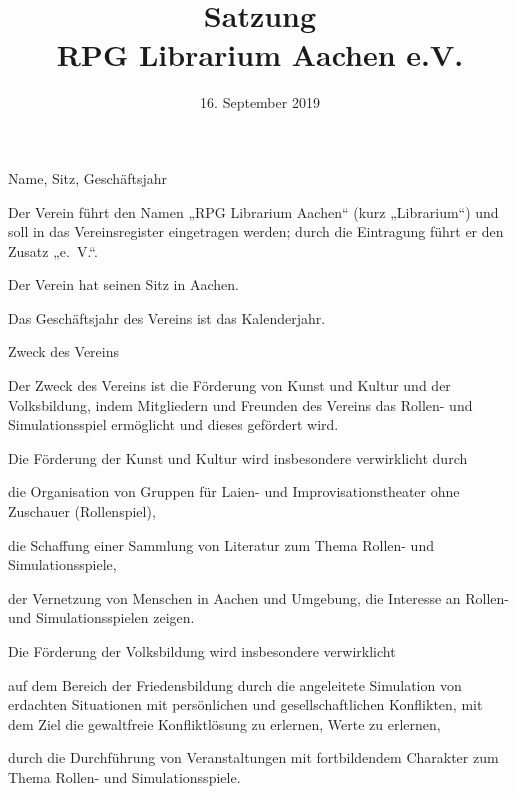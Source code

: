 \documentclass[11pt,a4paper,twoside,openany,article]{memoir}
\title{ Satzung \\ RPG Librarium Aachen e.V.}
\date{16. September 2019}
\begin{document}
  \maketitle
  \sloppy
\begin{para}{Name, Sitz, Geschäftsjahr}
  \label{p:name}
  \item Der Verein führt den Namen „RPG Librarium Aachen“ (kurz „Librarium“) und soll in das Vereinsregister eingetragen werden; durch die Eintragung führt er den Zusatz „e.~V.“.
  \item Der Verein hat seinen Sitz in Aachen.
  \item Das Geschäftsjahr des Vereins ist das Kalenderjahr.
\end{para}

\begin{para}{Zweck des Vereins}
  \label{p:zweck}
  \item Der Zweck des Vereins ist die Förderung von Kunst und Kultur und der Volksbildung, indem Mitgliedern und Freunden des Vereins das Rollen- und Simulationsspiel ermöglicht und dieses gefördert wird.
  \item Die Förderung der Kunst und Kultur wird insbesondere verwirklicht durch
  \begin{subpara}
    \item die Organisation von Gruppen für Laien- und Improvisationstheater ohne Zuschauer (Rollenspiel),
    \item die Schaffung einer Sammlung von Literatur zum Thema Rollen- und Simulationsspiele,
    \item der Vernetzung von Menschen in Aachen und Umgebung, die Interesse an Rollen- und Simulationsspielen zeigen.
  \end{subpara}
  \item Die Förderung der Volksbildung wird insbesondere verwirklicht
  \begin{subpara}
    \item auf dem Bereich der Friedensbildung durch die angeleitete Simulation von erdachten Situationen mit persönlichen und gesellschaftlichen Konflikten, mit dem Ziel die gewaltfreie Konfliktlösung zu erlernen,
 Werte zu erlernen,
    \item durch die Durchführung von Veranstaltungen mit fortbildendem Charakter zum Thema Rollen- und Simulationsspiele.
  \end{subpara}
\end{para}
\end{document}
